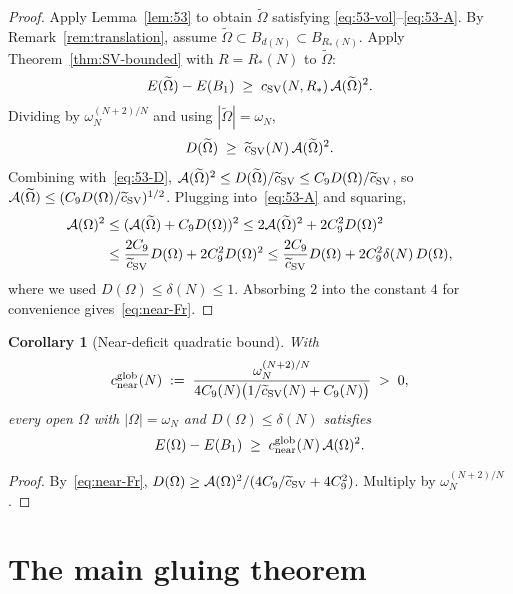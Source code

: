 \documentclass[11pt]{article}
\newtheorem{corollary}[theorem]{Corollary}
\theoremstyle{definition}
\newcommand{\Fr}{\mathcal{A}}
\newcommand{\Om}{\Omega}
\newcommand{\Otilde}{\widetilde{\Omega}}
\begin{document}
\begin{proof}
Apply Lemma~\ref{lem:53} to obtain $\Otilde$ satisfying
\eqref{eq:53-vol}--\eqref{eq:53-A}. By Remark~\ref{rem:translation},
assume $\Otilde\subset B_{d(N)}\subset B_{R_{*}(N)}$. Apply
Theorem~\ref{thm:SV-bounded} with $R=R_{*}(N)$ to $\Otilde$:
\[
   E(\Otilde)-E(B_{1})\;\ge\;c_{\rm SV}(N,R_{*})\,\Fr(\Otilde)^{2}.
\]
Dividing by $\omega_{N}^{(N+2)/N}$ and using $|\Otilde|=\omega_{N}$,
\begin{equation}\label{eq:D-tilde-A-tilde}
   D(\Otilde)\;\ge\;\widetilde c_{\rm SV}(N)\,\Fr(\Otilde)^{2}.
\end{equation}
Combining with~\eqref{eq:53-D},
$\Fr(\Otilde)^{2}\le D(\Otilde)/\widetilde c_{\rm SV}
\le C_{9}D(\Om)/\widetilde c_{\rm SV}$, so
$\Fr(\Otilde)\le(C_{9}D(\Om)/\widetilde c_{\rm SV})^{1/2}$. Plugging
into~\eqref{eq:53-A} and squaring,
\begin{align*}
   \Fr(\Om)^{2}
   &\le(\Fr(\Otilde)+C_{9}D(\Om))^{2}
    \le 2\Fr(\Otilde)^{2}+2C_{9}^{2}D(\Om)^{2}\\
   &\le\frac{2C_{9}}{\widetilde c_{\rm SV}}D(\Om)+2C_{9}^{2}D(\Om)^{2}
    \le\frac{2C_{9}}{\widetilde c_{\rm SV}}D(\Om)+2C_{9}^{2}\delta(N)\,D(\Om),
\end{align*}
where we used $D(\Om)\le\delta(N)\le 1$. Absorbing $2$ into the
constant $4$ for convenience gives~\eqref{eq:near-Fr}.
\end{proof}

\begin{corollary}[Near-deficit quadratic bound]\label{cor:near}
With
\begin{equation}\label{eq:c-near-glob}
   c_{\rm near}^{\rm glob}(N)
   \;:=\;\frac{\omega_{N}^{(N+2)/N}}{4C_{9}(N)\bigl(1/\widetilde c_{\rm SV}(N)+C_{9}(N)\bigr)}\;>\;0,
\end{equation}
every open $\Om$ with $|\Om|=\omega_{N}$ and $D(\Om)\le\delta(N)$
satisfies
\begin{equation}\label{eq:near-final}
   E(\Om)-E(B_{1})\;\ge\;c_{\rm near}^{\rm glob}(N)\,\Fr(\Om)^{2}.
\end{equation}
\end{corollary}

\begin{proof}
By~\eqref{eq:near-Fr},
$D(\Om)\ge\Fr(\Om)^{2}/(4C_{9}/\widetilde c_{\rm SV}+4C_{9}^{2})$.
Multiply by $\omega_{N}^{(N+2)/N}$.
\end{proof}

\section{The main gluing theorem}\label{sec:main}
\end{document}
